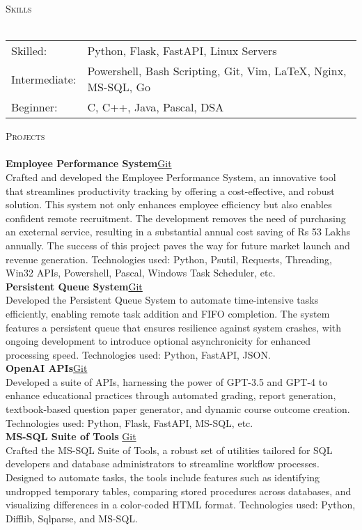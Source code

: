 \documentclass[a4paper]{article}
\newcommand{\lineunder} {
    \vspace*{-8pt} \\
    \hspace*{-18pt} \hrulefill \\
}
\newcommand{\header} [1] {
    {\hspace*{-18pt}\vspace*{6pt} \textsc{#1}}
    \vspace*{-6pt} \lineunder
}
\begin{document}

\header{Skills}
\begin{tabular}{V{5cm} @{\hskip 0.6cm} V{12cm}}
Skilled: & Python, Flask, FastAPI, Linux Servers \\
Intermediate: & Powershell, Bash Scripting, Git, Vim, \LaTeX, Nginx, MS-SQL, Go \\
Beginner: & C, C++, Java, Pascal, DSA \\
\end{tabular}

\vspace{4mm}

\header{Projects}
      {\textbf{Employee Performance System}}\hfill \href{https://github.com/swarnimcodes/employee-performance}{Git}\\
Crafted and developed the Employee Performance System, an innovative tool that streamlines productivity tracking by offering a cost-effective, and robust solution. This system not only enhances employee efficiency but also enables confident remote recruitment. The development removes the need of purchasing an exeternal service, resulting in a substantial annual cost saving of Rs 53 Lakhs annually. The success of this project paves the way for future market launch and revenue generation. Technologies used: Python, Psutil, Requests, Threading, Win32 APIs, Powershell, Pascal, Windows Task Scheduler, etc.\\
\vspace*{2mm}
      {\textbf{Persistent Queue System}}\hfill \href{https://github.com/swarnimcodes/kafkaesqueue}{Git}\\
Developed the Persistent Queue System to automate time-intensive tasks efficiently, enabling remote task addition and FIFO completion. The system features a persistent queue that ensures resilience against system crashes, with ongoing development to introduce optional asynchronicity for enhanced processing speed. Technologies used: Python, FastAPI, JSON.\\
\vspace*{2mm}
      {\textbf{OpenAI APIs}}\hfill \href{https://github.com/swarnimcodes/openai-gen-co-and-qp}{Git}\\
Developed a suite of APIs, harnessing the power of GPT-3.5 and GPT-4 to enhance educational practices through automated grading, report generation, textbook-based question paper generator, and dynamic course outcome creation. Technologies used: Python, Flask, FastAPI, MS-SQL, etc.\\
\vspace*{2mm}
      {\textbf{MS-SQL Suite of Tools }}\hfill \href{https://github.com/swarnimcodes/Sequel}{Git}\\
Crafted the MS-SQL Suite of Tools, a robust set of utilities tailored for SQL developers and database administrators to streamline workflow processes. Designed to automate tasks, the tools include features such as identifying undropped temporary tables, comparing stored procedures across databases, and visualizing differences in a color-coded HTML format. Technologies used: Python, Difflib, Sqlparse, and MS-SQL.\\
\vspace*{2mm}
\end{document}
